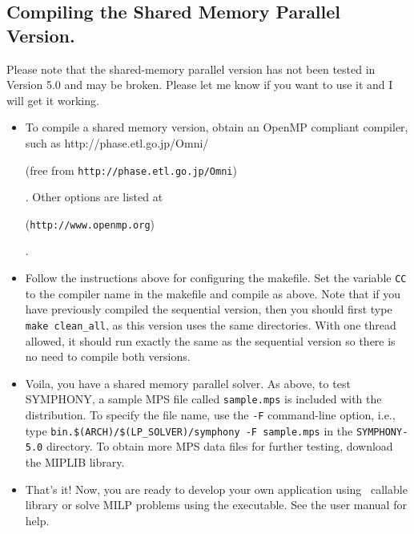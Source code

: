 \subsection{Compiling the Shared Memory Parallel Version.}

Please note that the shared-memory parallel version has not been tested in
Version 5.0 and may be broken. Please let me know if you want to use it and I
will get it working. 

\begin{itemize}
        \item To compile a shared memory version, obtain an OpenMP
        compliant compiler, such as 
        {http://phase.etl.go.jp/Omni/}
\begin{latexonly} 
        (free from {\tt http://phase.etl.go.jp/Omni})
\end{latexonly}. 
        Other options are listed at 
\begin{latexonly}
        ({\tt http://www.openmp.org})
\end{latexonly}.

        \item Follow the instructions above for configuring the makefile. Set
the variable {\tt CC} to the compiler name in the makefile and compile as
above. Note that if you have previously compiled the sequential version, then
you should first type {\tt make clean\_all}, as this version uses the same
directories.  With one thread allowed, it should run exactly the same as the
sequential version so there is no need to compile both versions.

        \item Voila, you have a shared memory parallel solver. As above, to
test SYMPHONY, a sample MPS file called \texttt{sample.mps} is included with 
the distribution. To specify the file name, use the \texttt{-F} command-line 
option, i.e., type \texttt{bin.\$(ARCH)/\$(LP\_SOLVER)/symphony -F sample.mps} 
in the \texttt{SYMPHONY-5.0} directory. To obtain more MPS data files for 
further testing, download the MIPLIB library.

\item That's it! Now, you are ready to develop your own application using 
\BB\ callable library or solve MILP problems using the executable. See the
user manual for help.

\end{itemize}

